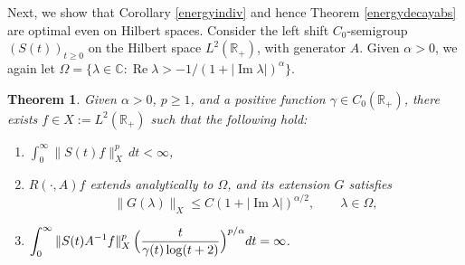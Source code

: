 \documentclass[11pt]{amsart}
\newtheorem{theorem}{Theorem}[section]
\theoremstyle{definition}
\theoremstyle{remark}
\numberwithin{equation}{section}
\begin{document}
Next, we show that Corollary \ref{energyindiv} and hence Theorem \ref{energydecayabs} are optimal even on Hilbert spaces. 
Consider the left shift $C_0$-semigroup $(S(t))_{t \ge 0}$ on the Hilbert space $L^2(\mathbb R_+)$, with generator $A$. Given $\alpha>0$, we again let $\Omega=\{\lambda \in\mathbb C: {\operatorname{Re}} \lambda > -1/(1+|{\operatorname{Im}}\lambda|)^\alpha\}$.

\begin{theorem}\label{t7}
Given $\alpha > 0$, $p\ge1$, and a positive function $\gamma
\in C_0(\mathbb R_+)$, there exists $f\in X:=L^2(\mathbb R_+)$ such that the following hold:
\begin{enumerate}[\rm (a)]
 \item \label{73a} $\int_0^\infty\|S(t)f\|_X^p\,dt<\infty$,
\smallskip
\item \label{73b} $R(\cdot,A)f$ extends analytically to $\Omega$, and its extension $G$ satisfies
$$
\|G(\lambda)\|_X \le C (1+|{\operatorname{Im}} \lambda|)^{\alpha/2}, \qquad \lambda\in\Omega,
$$
\item \label{73c} $\displaystyle
 \int_0^\infty \|S(t)A^{-1}f\|_X^p \, \Bigl(\frac{t}{\gamma(t)\log (t+2)}\Bigr)^{p/\alpha}dt = \infty$.
\end{enumerate}
\end{theorem}
\end{document}
